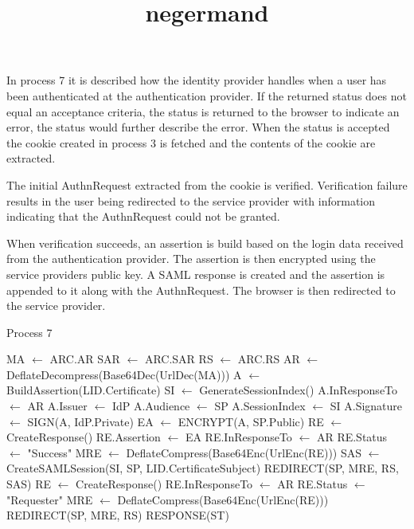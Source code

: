 \documentclass[twosided]{report}
\begin{document}
In process 7 it is described how the identity provider handles when a user has been authenticated at the authentication provider. If the returned status does not equal an acceptance criteria, the status is returned to the browser to indicate an error, the status would further describe the error. When the status is accepted the cookie created in process 3 is fetched and the contents of the cookie are extracted.
\par
The initial AuthnRequest extracted from the cookie is verified. Verification failure results in the user being redirected to the service provider with information indicating that the AuthnRequest could not be granted.
\par
When verification succeeds, an assertion is build based on the login data received from the authentication provider. The assertion is then encrypted using the service providers public key. A SAML response is created and the assertion is appended to it along with the AuthnRequest. The browser is then redirected to the service provider.
\begin{algorithm}[H]
	\title{negermand}
	\caption{Process 7}
	\begin{algorithmic}
			\STATE MA $\leftarrow$ ARC.AR
			\STATE SAR $\leftarrow$ ARC.SAR
			\STATE RS $\leftarrow$ ARC.RS
			\STATE AR $\leftarrow$ DeflateDecompress(Base64Dec(UrlDec(MA)))
				\STATE A $\leftarrow$ BuildAssertion(LID.Certificate)
				\STATE SI $\leftarrow$ GenerateSessionIndex()
				\STATE A.InResponseTo $\leftarrow$ AR
				\STATE A.Issuer $\leftarrow$ IdP
				\STATE A.Audience $\leftarrow$ SP
				\STATE A.SessionIndex $\leftarrow$ SI
				\STATE A.Signature $\leftarrow$ SIGN(A, IdP.Private)
				\STATE EA $\leftarrow$ ENCRYPT(A, SP.Public)
				\STATE RE $\leftarrow$ CreateResponse()
				\STATE RE.Assertion $\leftarrow$ EA
				\STATE RE.InResponseTo $\leftarrow$ AR
				\STATE RE.Status $\leftarrow$ "Success"
				\STATE MRE $\leftarrow$ DeflateCompress(Base64Enc(UrlEnc(RE)))
				\STATE SAS $\leftarrow$ CreateSAMLSession(SI, SP, LID.CertificateSubject)
				\RETURN REDIRECT(SP, MRE, RS, SAS)
			\ELSE
				\STATE RE $\leftarrow$ CreateResponse()
				\STATE RE.InResponseTo $\leftarrow$ AR
				\STATE RE.Status $\leftarrow$ "Requester"
				\STATE MRE $\leftarrow$ DeflateCompress(Base64Enc(UrlEnc(RE)))
				\RETURN REDIRECT(SP, MRE, RS)
			\ENDIF	
		\ELSE
			\RETURN RESPONSE(ST)
		\ENDIF
	\end{algorithmic}
\end{algorithm}
\end{document}
